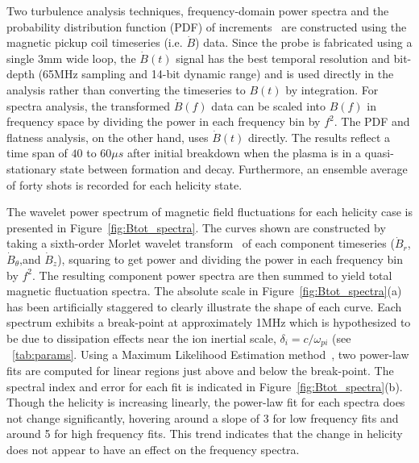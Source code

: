\documentclass[aps,prl,amsmath,amssymb,reprint,superscriptaddress]{revtex4-1} %
\begin{document}
Two turbulence analysis techniques, frequency-domain power spectra and the probability distribution function (PDF) of increments~\cite{Greco09} are constructed using the magnetic pickup coil timeseries (i.e. $\dot{B}$) data. Since the probe is fabricated using a single 3mm wide loop, the $\dot{B}(t)$ signal has the best temporal resolution and bit-depth (65MHz sampling and 14-bit dynamic range) and is used directly in the analysis rather than converting the timeseries to $B(t)$ by integration. For spectra analysis, the transformed $\dot{B}(f)$ data can be scaled into $B(f)$ in frequency space by dividing the power in each frequency bin by $f^{2}$. The PDF and flatness analysis, on the other hand, uses $\dot{B}(t)$ directly. The results reflect a time span of $40$ to $60 \mu s$ after initial breakdown when the plasma is in a quasi-stationary state between formation and decay. Furthermore, an ensemble average of forty shots is recorded for each helicity state.

The wavelet power spectrum of magnetic field fluctuations for each helicity case is presented in Figure~\ref{fig:Btot_spectra}. The curves shown are constructed by taking a sixth-order Morlet wavelet transform~\cite{torrence98} of each component timeseries ($\dot{B}_r$,$\dot{B}_{\theta}$,and $\dot{B}_{z}$), squaring to get power and dividing the power in each frequency bin by $f^{2}$. The resulting component power spectra are then summed to yield total magnetic fluctuation spectra. The absolute scale in Figure~\ref{fig:Btot_spectra}(a) has been artificially staggered to clearly illustrate the shape of each curve. Each spectrum exhibits a break-point at approximately 1MHz which is hypothesized to be due to dissipation effects near the ion inertial scale, $\delta_{i} = c/\omega_{pi}$ (see ~\ref{tab:params}. Using a Maximum Likelihood Estimation method~\cite{deWit13,clauset09}, two power-law fits are computed for linear regions just above and below the break-point. The spectral index and error for each fit is indicated in Figure~\ref{fig:Btot_spectra}(b). Though the helicity is increasing linearly, the power-law fit for each spectra does not change significantly, hovering around a slope of 3 for low frequency fits and around 5 for high frequency fits. This trend indicates that the change in helicity does not appear to have an effect on the frequency spectra.
\end{document}
